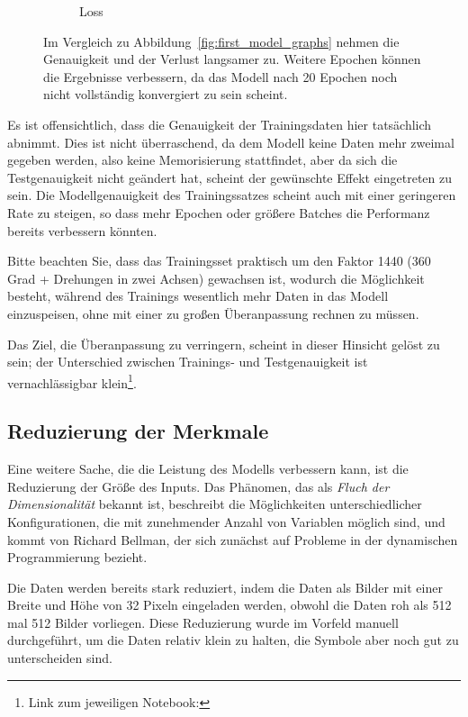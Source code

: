 \begin{figure}
\begin{subfigure}[b]{0.4\textwidth}
        \caption{Loss}
        \label{fig:first_model_data_augmentation_loss}
    \end{subfigure}
    \caption[Training nach Augmentierung der Daten]{Im Vergleich zu Abbildung~\ref{fig:first_model_graphs} nehmen die Genauigkeit und der Verlust langsamer zu. Weitere Epochen können die Ergebnisse verbessern, da das Modell nach 20 Epochen noch nicht vollständig konvergiert zu sein scheint.}
    \label{fig:first_model_data_augmentation_graphs}
\end{figure}

Es ist offensichtlich, dass die Genauigkeit der Trainingsdaten hier tatsächlich abnimmt.
Dies ist nicht überraschend, da dem Modell keine Daten mehr zweimal gegeben werden, also keine Memorisierung stattfindet, aber da sich die Testgenauigkeit nicht geändert hat, scheint der gewünschte Effekt eingetreten zu sein.
Die Modellgenauigkeit des Trainingssatzes scheint auch mit einer geringeren Rate zu steigen, so dass mehr Epochen oder größere Batches die Performanz bereits verbessern könnten.

Bitte beachten Sie, dass das Trainingsset praktisch um den Faktor 1440 (360 Grad + Drehungen in zwei Achsen) gewachsen ist, wodurch die Möglichkeit besteht, während des Trainings wesentlich mehr Daten in das Modell einzuspeisen, ohne mit einer zu großen Überanpassung rechnen zu müssen.

Das Ziel, die Überanpassung zu verringern, scheint in dieser Hinsicht gelöst zu sein; der Unterschied zwischen Trainings- und Testgenauigkeit ist vernachlässigbar klein{\footnote{Link zum jeweiligen Notebook: }}.

\subsection{Reduzierung der Merkmale}

Eine weitere Sache, die die Leistung des Modells verbessern kann, ist die Reduzierung der Größe des Inputs.
Das Phänomen, das als \textit{Fluch der Dimensionalität} bekannt ist, beschreibt die Möglichkeiten unterschiedlicher Konfigurationen, die mit zunehmender Anzahl von Variablen möglich sind, und kommt von Richard Bellman, der sich zunächst auf Probleme in der dynamischen Programmierung \cite[p.ix]{Bellman1957} bezieht.

Die Daten werden bereits stark reduziert, indem die Daten als Bilder mit einer Breite und Höhe von 32 Pixeln eingeladen werden, obwohl die Daten roh als 512 mal 512 Bilder vorliegen. Diese Reduzierung wurde im Vorfeld manuell durchgeführt, um die Daten relativ klein zu halten, die Symbole aber noch gut zu unterscheiden sind.

